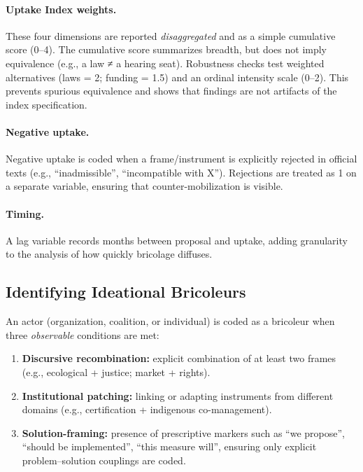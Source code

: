 \paragraph{Uptake Index weights.}
These four dimensions are reported \emph{disaggregated} and as a simple cumulative score (0–4).  
The cumulative score summarizes breadth, but does not imply equivalence (e.g., a law ≠ a 
hearing seat). Robustness checks test weighted alternatives (laws = 2; funding = 1.5) 
and an ordinal intensity scale (0–2). This prevents spurious equivalence and shows that 
findings are not artifacts of the index specification.

\paragraph{Negative uptake.}
Negative uptake is coded when a frame/instrument is explicitly rejected in official 
texts (e.g., ``inadmissible'', ``incompatible with X''). Rejections are treated as 1 
on a separate variable, ensuring that counter-mobilization is visible.

\paragraph{Timing.}
A lag variable records months between proposal and uptake, adding granularity 
to the analysis of how quickly bricolage diffuses.

\subsection*{Identifying Ideational Bricoleurs}
An actor (organization, coalition, or individual) is coded as a bricoleur when 
three \emph{observable} conditions are met:

\begin{enumerate}
    \item \textbf{Discursive recombination:} explicit combination of at least two 
    frames (e.g., ecological + justice; market + rights). 
    \item \textbf{Institutional patching:} linking or adapting instruments from 
    different domains (e.g., certification + indigenous co-management). 
    \item \textbf{Solution-framing:} presence of prescriptive markers such as 
    ``we propose'', ``should be implemented'', ``this measure will'', ensuring 
    only explicit problem–solution couplings are coded. 
\end{enumerate}

